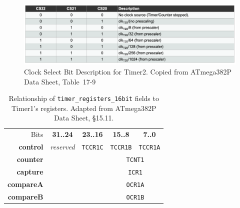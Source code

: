 \begin{figure}
    \centering
    \includegraphics[width=15cm]{CS-Timer2}
    \caption{Clock Select Bit Description for Timer2. \tiny Copied from ATmega382P Data Sheet, Table~17-9 \label{fig:Timer2CS}}
\end{figure}

\begin{table}
    \centering \small
    \begin{tabular}{|r||c|c|c|c||}
        \hline
        Bits                & \textbf{31..24}   & \textbf{23..16}   & \textbf{15..8}    & \textbf{7..0}     \\ \cline{2-5}
        \textbf{control}    & \textit{reserved} & \texttt{TCCR1C}   & \texttt{TCCR1B}   & \texttt{TCCR1A}   \\
        \textbf{counter}    & \multicolumn{2}{c|}{}                 & \multicolumn{2}{c||}{\texttt{TCNT1}}  \\
        \textbf{capture}    & \multicolumn{2}{c|}{}                 & \multicolumn{2}{c||}{\texttt{ICR1}}   \\
        \textbf{compareA}   & \multicolumn{2}{c|}{}                 & \multicolumn{2}{c||}{\texttt{OCR1A}}  \\
        \textbf{compareB}   & \multicolumn{2}{c|}{}                 & \multicolumn{2}{c||}{\texttt{OCR1B}}  \\ \hline
    \end{tabular}
    \caption{Relationship of \lstinline{timer_registers_16bit} fields to Timer1's registers. \tiny Adapted from ATmega382P Data Sheet, §15.11. \label{table:Timer1Registers}}
\end{table}

